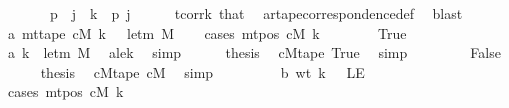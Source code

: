 \begin{isabellebody}
\ \ \ \ \ {\isachardoublequoteopen}{}\ {\isasymle}\ p{\isachardoublequoteclose}\ \ {\isachardoublequoteopen}j\ {\isacharless}{\kern0pt}\ {\isacharquery}{\kern0pt}k{\isachardoublequoteclose}\ \ p\ j\isanewline
\ \ \ \ \isamarkupfalse%
\ tcorr{\isacharunderscore}{\kern0pt}k\ that\ \isamarkupfalse%
\ ar{\isacharunderscore}{\kern0pt}tape{\isacharunderscore}{\kern0pt}correspondence{\isacharunderscore}{\kern0pt}def\ \isamarkupfalse%
\ blast\isanewline
\ \ %
\isanewline
\ \ \isamarkupfalse%
\ a{\isacharcolon}{\kern0pt}\ {\isachardoublequoteopen}mt{\isacharunderscore}{\kern0pt}tape\ cM{\isacharunderscore}{\kern0pt}{}\ k\ {}\ {\isacharequal}{\kern0pt}\ le{\isacharunderscore}{\kern0pt}tm\ M{\isachardoublequoteclose}\isanewline
\ \ \isamarkupfalse%
\ {\isacharparenleft}{\kern0pt}cases\ {\isachardoublequoteopen}mt{\isacharunderscore}{\kern0pt}pos\ cM\ k\ {\isacharequal}{\kern0pt}\ {}{\isachardoublequoteclose}{\isacharparenright}{\kern0pt}\isanewline
\ \ \ \ \isamarkupfalse%
\ True\isanewline
\ \ \ \ \isamarkupfalse%
\ {\isachardoublequoteopen}a{\isacharprime}{\kern0pt}\ k\ {\isacharequal}{\kern0pt}\ le{\isacharunderscore}{\kern0pt}tm\ M{\isachardoublequoteclose}\ \isamarkupfalse%
\ a{\isacharprime}{\kern0pt}le{}{\isacharunderscore}{\kern0pt}k\ \isamarkupfalse%
\ simp\isanewline
\ \ \ \ \isamarkupfalse%
\ {\isacharquery}{\kern0pt}thesis\ \isamarkupfalse%
\ cM{}tape\ True\ \isamarkupfalse%
\ simp\isanewline
\ \ \isamarkupfalse%
\isanewline
\ \ \ \ \isamarkupfalse%
\ False\isanewline
\ \ \ \ \isamarkupfalse%
\ {\isacharquery}{\kern0pt}thesis\ \isamarkupfalse%
\ cM{}tape\ cM{}\ \isamarkupfalse%
\ simp\isanewline
\ \ \isamarkupfalse%
\isanewline
\ \ %
\isanewline
\ \ \isamarkupfalse%
\ b{\isacharcolon}{\kern0pt}\ {\isachardoublequoteopen}wt\ k\ {}\ {\isacharequal}{\kern0pt}\ LE{}{\isachardoublequoteclose}\isanewline
\ \ \isamarkupfalse%
\ {\isacharparenleft}{\kern0pt}cases\ {\isachardoublequoteopen}mt{\isacharunderscore}{\kern0pt}pos\ cM\ k\ {\isacharequal}{\kern0pt}\ {}{\isachardoublequoteclose}{\isacharparenright}{\kern0pt}\isanewline

\end{isabellebody}

